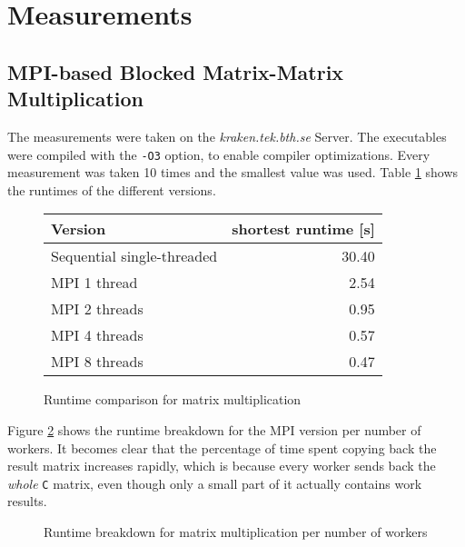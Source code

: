 \documentclass[]{article}
\begin{document}
\section{Measurements}

\subsection{MPI-based Blocked Matrix-Matrix Multiplication}

The measurements were taken on the \emph{kraken.tek.bth.se} Server. The executables were compiled with the \texttt{-O3} option, to enable compiler optimizations. Every measurement was taken 10 times and the smallest value was used. Table \ref{tab:matrix-mult-runtime} shows the runtimes of the different versions.

\begin{figure}[h]
	\centering
	\begin{tabular}{|l|r|}
		\hline
		\textbf{Version} & \textbf{shortest runtime [s]} \\
		\hline
		Sequential single-threaded & 30.40 \\ 
		\hline 
		MPI 1 thread & 2.54 \\ 
		\hline 
		MPI 2 threads & 0.95 \\ 
		\hline 
		MPI 4 threads & 0.57 \\ 
		\hline 
		MPI 8 threads & 0.47 \\ 
		\hline 
	\end{tabular} 
	\caption{Runtime comparison for matrix multiplication}
	\label{tab:matrix-mult-runtime}
\end{figure}

Figure \ref{fig:maxtrix-mult-chart} shows the runtime breakdown for the MPI version per number of workers. It becomes clear that the percentage of time spent copying back the result matrix increases rapidly, which is because every worker sends back the \emph{whole} \texttt{C} matrix, even though only a small part of it actually contains work results.

\begin{figure}[h]
	\centering
	\caption{Runtime breakdown for matrix multiplication per number of workers}
	\label{fig:maxtrix-mult-chart}
\end{figure}
\end{document}

